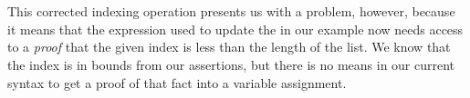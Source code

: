 \documentclass[sigplan]{acmart}%
\begin{document}
\begin{code}
\>[2]\AgdaOperator{\AgdaFunction{\AgdaUnderscore{}!\AgdaUnderscore{}}}\AgdaSpace{}%
\AgdaSymbol{:}\AgdaSpace{}%
\AgdaSpace{}%
\AgdaSymbol{\{}\AgdaSymbol{\}}\AgdaSpace{}%
\AgdaSpace{}%
\AgdaSymbol{(}\AgdaSpace{}%
\AgdaSymbol{:}\AgdaSpace{}%
\AgdaSpace{}%
\AgdaSymbol{)}\AgdaSpace{}%
\AgdaSpace{}%
\AgdaSpace{}%
\AgdaOperator{\AgdaFunction{<}}\AgdaSpace{}%
\AgdaSpace{}%
\AgdaSpace{}%
\AgdaSpace{}%
\<%
\\
%
\>[2]\AgdaOperator{\AgdaFunction{\AgdaUnderscore{}!\AgdaUnderscore{}}}\AgdaSpace{}%
\AgdaSymbol{\{}\AgdaSpace{}%
\AgdaSymbol{=}\AgdaSpace{}%
\AgdaSpace{}%
\AgdaSymbol{\AgdaUnderscore{}\}}\AgdaSpace{}%
\AgdaSymbol{(}\AgdaSpace{}%
\AgdaSpace{}%
\AgdaSymbol{)}\AgdaSpace{}%
\AgdaSymbol{(}\AgdaSpace{}%
\AgdaSymbol{)}\AgdaSpace{}%
\AgdaSymbol{=}\AgdaSpace{}%
\AgdaSpace{}%
\AgdaOperator{\AgdaFunction{!}}\AgdaSpace{}%
\<%
\\
%
\>[2]\AgdaOperator{\AgdaFunction{\AgdaUnderscore{}!\AgdaUnderscore{}}}\AgdaSpace{}%
\AgdaSymbol{\{}\AgdaSpace{}%
\AgdaSymbol{=}\AgdaSpace{}%
\AgdaSpace{}%
\AgdaSymbol{\}}\AgdaSpace{}%
\AgdaSymbol{(}\AgdaSpace{}%
\AgdaSpace{}%
\AgdaSymbol{)}\AgdaSpace{}%
\AgdaSymbol{(}\AgdaSpace{}%
\AgdaSymbol{)}\AgdaSpace{}%
\AgdaSymbol{=}\AgdaSpace{}%
\<%
\end{code}
This corrected indexing operation presents us with a problem, however, 
because it means that the expression used to update the 
in our example now needs access to a \emph{proof} that the given 
index is less than the length of the list. We know that the index is in 
bounds from our assertions, but there is no means in our current syntax 
to get a proof of that fact into a variable assignment.
\end{document}

